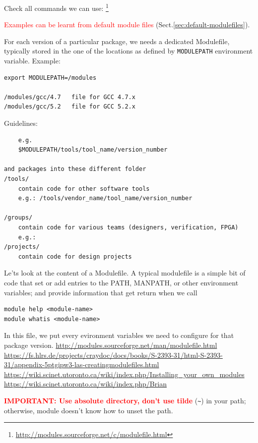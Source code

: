 Check all
commands we can
use: \footnote{\url{http://modules.sourceforge.net/c/modulefile.html}}

\textcolor{red}{Examples can be learnt from default module files}
(Sect.\ref{sec:default-modulefiles}).

For each version of a particular package, we needs a dedicated Modulefile,
typically stored in the one of the locations as defined by \verb!MODULEPATH!
environment variable. Example: 
\begin{verbatim}
export MODULEPATH=/modules

/modules/gcc/4.7   file for GCC 4.7.x
/modules/gcc/5.2   file for GCC 5.2.x
\end{verbatim}

\begin{mdframed}
Guidelines:
\begin{verbatim}
	e.g. 
	$MODULEPATH/tools/tool_name/version_number

and packages into these different folder
/tools/
	contain code for other software tools
	e.g.: /tools/vendor_name/tool_name/version_number
	
/groups/
	contain code for various teams (designers, verification, FPGA)
	e.g.: 
/projects/
	contain code for design projects

\end{verbatim}
\end{mdframed}


Le'ts look at the content of a Modulefile. A typical modulefile is a simple bit
of code that set or add entries to the PATH, MANPATH, or other environment
variables; and provide information that get return when we call
\begin{verbatim}
module help <module-name>
module whatis <module-name>
\end{verbatim}

In this file, we put every evironment variables we need to configure for that
package version.
\url{http://modules.sourceforge.net/man/modulefile.html}
\url{https://fs.hlrs.de/projects/craydoc/docs/books/S-2393-31/html-S-2393-31/appendix-5ptgipw3-las-creatingmodulefiles.html}
\url{https://wiki.scinet.utoronto.ca/wiki/index.php/Installing_your_own_modules}
\url{https://wiki.scinet.utoronto.ca/wiki/index.php/Brian}

\textcolor{red}{\bf IMPORTANT: Use absolute directory, don't use tilde
} (\verb!~!) in your path; otherwise, module doesn't know how to unset the
path.


